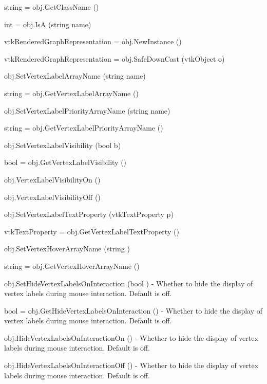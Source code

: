 \begin{DoxyItemize}
\item {\ttfamily string = obj.\-Get\-Class\-Name ()}  
\item {\ttfamily int = obj.\-Is\-A (string name)}  
\item {\ttfamily vtk\-Rendered\-Graph\-Representation = obj.\-New\-Instance ()}  
\item {\ttfamily vtk\-Rendered\-Graph\-Representation = obj.\-Safe\-Down\-Cast (vtk\-Object o)}  
\item {\ttfamily obj.\-Set\-Vertex\-Label\-Array\-Name (string name)}  
\item {\ttfamily string = obj.\-Get\-Vertex\-Label\-Array\-Name ()}  
\item {\ttfamily obj.\-Set\-Vertex\-Label\-Priority\-Array\-Name (string name)}  
\item {\ttfamily string = obj.\-Get\-Vertex\-Label\-Priority\-Array\-Name ()}  
\item {\ttfamily obj.\-Set\-Vertex\-Label\-Visibility (bool b)}  
\item {\ttfamily bool = obj.\-Get\-Vertex\-Label\-Visibility ()}  
\item {\ttfamily obj.\-Vertex\-Label\-Visibility\-On ()}  
\item {\ttfamily obj.\-Vertex\-Label\-Visibility\-Off ()}  
\item {\ttfamily obj.\-Set\-Vertex\-Label\-Text\-Property (vtk\-Text\-Property p)}  
\item {\ttfamily vtk\-Text\-Property = obj.\-Get\-Vertex\-Label\-Text\-Property ()}  
\item {\ttfamily obj.\-Set\-Vertex\-Hover\-Array\-Name (string )}  
\item {\ttfamily string = obj.\-Get\-Vertex\-Hover\-Array\-Name ()}  
\item {\ttfamily obj.\-Set\-Hide\-Vertex\-Labels\-On\-Interaction (bool )} -\/ Whether to hide the display of vertex labels during mouse interaction. Default is off.  
\item {\ttfamily bool = obj.\-Get\-Hide\-Vertex\-Labels\-On\-Interaction ()} -\/ Whether to hide the display of vertex labels during mouse interaction. Default is off.  
\item {\ttfamily obj.\-Hide\-Vertex\-Labels\-On\-Interaction\-On ()} -\/ Whether to hide the display of vertex labels during mouse interaction. Default is off.  
\item {\ttfamily obj.\-Hide\-Vertex\-Labels\-On\-Interaction\-Off ()} -\/ Whether to hide the display of vertex labels during mouse interaction. Default is off.  

\end{DoxyItemize}

